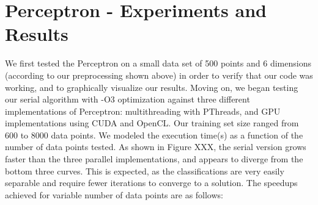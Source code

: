 \documentclass{article}
\begin{document}
\clearpage
\section{Perceptron - Experiments and Results}
We first tested the Perceptron on a small data set of 500 points and 6 dimensions (according to our preprocessing shown above) in order to verify that our code was working, and to graphically visualize our results. Moving on, we began testing our serial algorithm with -O3 optimization against three different implementations of Perceptron: multithreading with PThreads, and GPU implementations using CUDA and OpenCL. Our training set size ranged from 600 to 8000 data points. We modeled the execution time(s) as a function of the number of data points tested. As shown in Figure XXX, the serial version grows faster than the three parallel implementations, and appears to diverge from the bottom three curves. This is expected, as the classifications are very easily separable and require fewer iterations to converge to a solution. The speedups achieved for variable number of data points are as follows:
\end{document}
